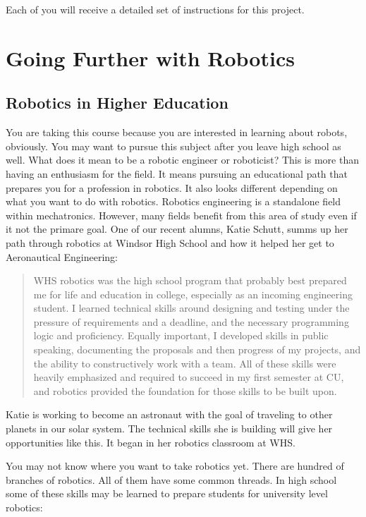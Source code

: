 \documentclass[
]{book}
\begin{document}
Each of you will receive a detailed set of instructions for this project.

\hypertarget{going-further-with-robotics}{%
\chapter{Going Further with Robotics}\label{going-further-with-robotics}}

\hypertarget{robotics-in-higher-education}{%
\section{Robotics in Higher Education}\label{robotics-in-higher-education}}

You are taking this course because you are interested in learning about robots, obviously. You may want to pursue this subject after you leave high school as well. What does it mean to be a robotic engineer or roboticist? This is more than having an enthusiasm for the field. It means pursuing an educational path that prepares you for a profession in robotics. It also looks different depending on what you want to do with robotics. Robotics engineering is a standalone field within mechatronics. However, many fields benefit from this area of study even if it not the primare goal. One of our recent alumns, Katie Schutt, summs up her path through robotics at Windsor High School and how it helped her get to Aeronautical Engineering:

\begin{quote}
WHS robotics was the high school program that probably best prepared me for life and education in college, especially as an incoming engineering student. I learned technical skills around designing and testing under the pressure of requirements and a deadline, and the necessary programming logic and proficiency. Equally important, I developed skills in public speaking, documenting the proposals and then progress of my projects, and the ability to constructively work with a team. All of these skills were heavily emphasized and required to succeed in my first semester at CU, and robotics provided the foundation for those skills to be built upon.
\end{quote}

Katie is working to become an astronaut with the goal of traveling to other planets in our solar system. The technical skills she is building will give her opportunities like this. It began in her robotics classroom at WHS.

You may not know where you want to take robotics yet. There are hundred of branches of robotics. All of them have some common threads. In high school some of these skills may be learned to prepare students for university level robotics:
\end{document}
